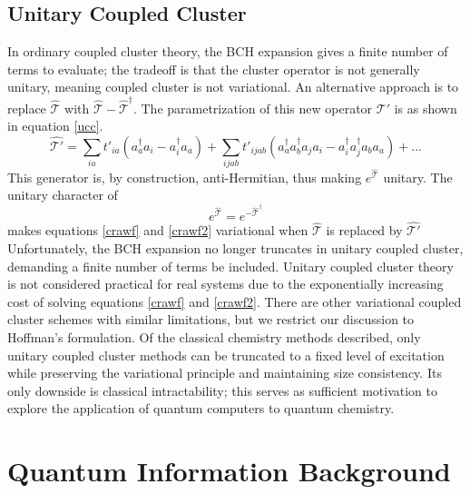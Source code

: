\documentclass{article}
\begin{document}
\subsection{Unitary Coupled Cluster}
\begin{paragraph}{}
In ordinary coupled cluster theory, the BCH expansion gives a finite number of terms to evaluate; the tradeoff is that the cluster operator is not generally unitary, meaning coupled cluster is not variational.  \cite{crawford} An alternative approach is to replace $\hat{\mathcal{T}}$ with $\hat{\mathcal{T}}-\hat{\mathcal{T}}^\dagger$. \cite{hoffman}  The parametrization of this new operator $\mathcal{T'}$ is as shown in equation \ref{ucc}. \cite{crawford}\cite{hoffman}
\begin{equation}\label{ucc}
\hat{\mathcal{T'}}=\sum_{ia}t'_{ia}\left(a_a^\dagger a_i-a_i^\dagger a_a\right)+\sum_{ijab}t'_{ijab}\left(a_a^\dagger a_b^\dagger a_j a_i-a_i^\dagger a_j^\dagger a_b a_a \right)+...
\end{equation}
This generator is, by construction, anti-Hermitian, thus making $e^{\hat{\mathcal{T}}}$ unitary. \cite{hoffman,gallier}  The unitary character of 
$$e^{\hat{\mathcal{T}}}=e^{-\hat{\mathcal{T}}^\dagger}$$
makes equations \ref{crawf} and \ref{crawf2} variational when $\hat{\mathcal{T}}$ is replaced by $\hat{\mathcal{T'}}$ \cite{crawford} Unfortunately, the BCH expansion no longer truncates in unitary coupled cluster, demanding a finite number of terms be included. \cite{crawford,hoffman,evangelista,bartlett} Unitary coupled cluster theory is not considered practical for real systems due to the exponentially increasing cost of solving equations \ref{crawf} and \ref{crawf2}. \cite{evangelista,joonho,bartlett} There are other variational coupled cluster schemes with similar limitations, but we restrict our discussion to Hoffman's formulation. \cite{hoffman,crawford,evangelista}  Of the classical chemistry methods described, only unitary coupled cluster methods can be truncated to a fixed level of excitation while preserving the variational principle and maintaining size consistency.  Its only downside is classical intractability; this serves as sufficient motivation to explore the application of quantum computers to quantum chemistry.
\end{paragraph}


\section{Quantum Information Background}
\end{document}
